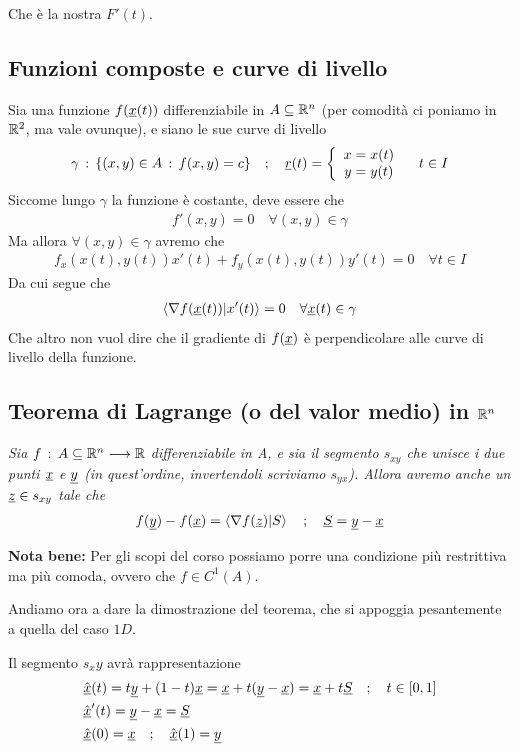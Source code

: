 Che è la nostra $F'(t)$.

\subsection{Funzioni composte e curve di livello}

Sia una funzione $f(\underline{x}(t))$ differenziabile in $A\subseteq \mathbb{R}^n$ (per comodità ci poniamo in $\mathbb{R}^2$, ma vale ovunque), e siano le sue curve di livello
\begin{align}
	\gamma \, : \, \{(x,y)\in A \, : \, f(x,y)=c\} \quad ; \quad \underline{r}(t)=\left\{\begin{array}{cc} x=x(t) \\ y=y(t) \end{array}\right. \quad t\in I
\end{align}
Siccome lungo $\gamma$ la funzione è costante, deve essere che 
\begin{align}
	f'(x,y)=0 \quad \forall(x,y)\in \gamma
\end{align}
Ma allora $\forall(x,y)\in \gamma$ avremo che
\begin{align}
	f_x(x(t),y(t))x'(t) + f_y(x(t),y(t))y'(t)=0 \quad \forall t\in I
\end{align}
Da cui segue che
\begin{align}
	\braket{\nabla f(\underline{x}(t))|x'(t)} = 0 \quad \forall \underline{x}(t)\in \gamma
\end{align}
Che altro non vuol dire che il gradiente di $f(\underline{x})$ è perpendicolare alle curve di livello della funzione.

\subsection{Teorema di Lagrange (o del valor medio) in $\mathbb{R}^n$}

\textit{Sia $f \, : \, A \subseteq \mathbb{R}^n \longrightarrow \mathbb{R}$ differenziabile in A, e sia il segmento $s_{xy}$ che unisce i due punti $\underline{x}$ e $\underline{y}$ (in quest'ordine, invertendoli scriviamo $s_{yx}$). Allora avremo anche un $\underline{z} \in s_{xy}$ tale che}
\begin{align}
	f(\underline{y}) - f(\underline{x})= \braket{\nabla f(\underline{z})|S} \quad ; \quad \underline{S}= \underline{y} - \underline{x}
\end{align}

\bigskip
\textbf{Nota bene:} Per gli scopi del corso possiamo porre una condizione più restrittiva ma più comoda, ovvero che $f\in C^1(A)$.
\bigskip

Andiamo ora a dare la dimostrazione del teorema, che si appoggia pesantemente a quella del caso $1D$.

\bigskip
Il segmento $s_xy$ avrà rappresentazione
\begin{align}
	{}&\hat{\underline{x}}(t)= t \underline{y} + (1-t)\underline{x} = \underline{x} + t(\underline{y}-\underline{x})= \underline{x} + t\underline{S} \quad ; \quad t\in [0,1] \\
	&\hat{\underline{x}}'(t)= \underline{y}-\underline{x} = \underline{S} \\
	&\hat{\underline{x}}(0)=\underline{x} \quad ; \quad \hat{\underline{x}}(1)=\underline{y} 
\end{align}

